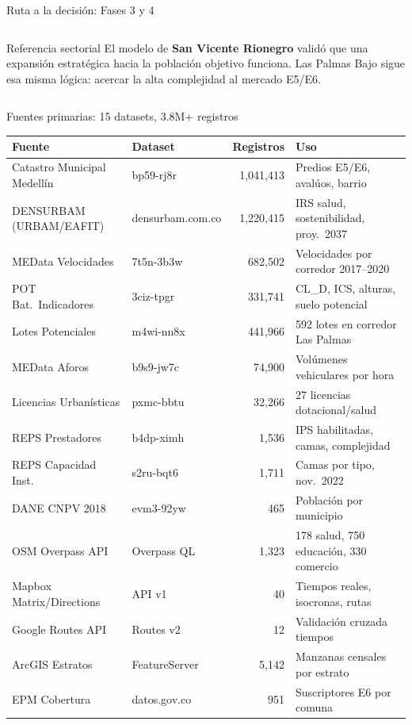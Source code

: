 \documentclass[aspectratio=169, 11pt]{beamer}
\begin{document}
\begin{frame}{Ruta a la decisión: Fases 3 y 4}
\begin{columns}[T]
\vspace{4pt}
\begin{exampleblock}{\small Referencia sectorial}
\footnotesize El modelo de \textbf{San Vicente Rionegro} validó que una expansión estratégica hacia la población objetivo funciona. Las Palmas Bajo sigue esa misma lógica: acercar la alta complejidad al mercado E5/E6.
\end{exampleblock}
\end{columns}
\end{frame}

\begin{frame}{Fuentes primarias: 15 datasets, 3.8M+ registros}

\vspace{2pt}
{\scriptsize
\begin{tabular}{@{}p{4.0cm}lrp{5.5cm}@{}}
\toprule
\textbf{Fuente} & \textbf{Dataset} & \textbf{Registros} & \textbf{Uso} \\
\midrule
Catastro Municipal Medellín & bp59-rj8r & 1,041,413 & Predios E5/E6, avalúos, barrio \\
DENSURBAM (URBAM/EAFIT) & densurbam.com.co & 1,220,415 & IRS salud, sostenibilidad, proy.\ 2037 \\
MEData Velocidades & 7t5n-3b3w & 682,502 & Velocidades por corredor 2017--2020 \\
POT Bat.\ Indicadores & 3ciz-tpgr & 331,741 & CL\_D, ICS, alturas, suelo potencial \\
Lotes Potenciales & m4wi-nn8x & 441,966 & 592 lotes en corredor Las Palmas \\
MEData Aforos & b9s9-jw7c & 74,900 & Volúmenes vehiculares por hora \\
Licencias Urbanísticas & pxmc-bbtu & 32,266 & 27 licencias dotacional/salud \\
REPS Prestadores & b4dp-ximh & 1,536 & IPS habilitadas, camas, complejidad \\
REPS Capacidad Inst.\ & s2ru-bqt6 & 1,711 & Camas por tipo, nov.\ 2022 \\
DANE CNPV 2018 & evm3-92yw & 465 & Población por municipio \\
OSM Overpass API & Overpass QL & 1,323 & 178 salud, 750 educación, 330 comercio \\
Mapbox Matrix/Directions & API v1 & 40 & Tiempos reales, isocronas, rutas \\
Google Routes API & Routes v2 & 12 & Validación cruzada tiempos \\
ArcGIS Estratos & FeatureServer & 5,142 & Manzanas censales por estrato \\
EPM Cobertura & datos.gov.co & 951 & Suscriptores E6 por comuna \\
\bottomrule
\end{tabular}
}


\end{frame}
\end{document}
